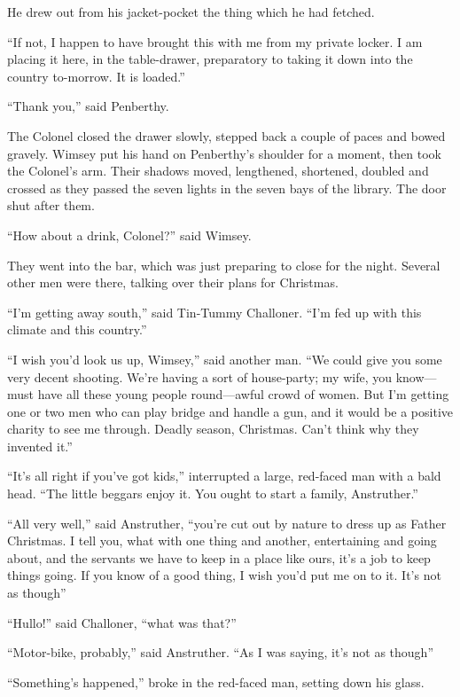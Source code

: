 He drew out from his jacket-pocket the thing which he had fetched.

\enquote{If not, I happen to have brought this with me from my private locker. I am placing it here, in the table-drawer, preparatory to taking it down into the country to-morrow. It is loaded.}

\enquote{Thank you,} said Penberthy.

The Colonel closed the drawer slowly, stepped back a couple of paces and bowed gravely. Wimsey put his hand on Penberthy's shoulder for a moment, then took the Colonel's arm. Their shadows moved, lengthened, shortened, doubled and crossed as they passed the seven lights in the seven bays of the library. The door shut after them.

\enquote{How about a drink, Colonel?} said Wimsey.

They went into the bar, which was just preparing to close for the night. Several other men were there, talking over their plans for Christmas.

\enquote{I'm getting away south,} said Tin-Tummy Challoner. \enquote{I'm fed up with this climate and this country.}

\enquote{I wish you'd look us up, Wimsey,} said another man. \enquote{We could give you some very decent shooting. We're having a sort of house-party; my wife, you know\allowbreak---\allowbreak must have all these young people round\allowbreak---\allowbreak awful crowd of women. But I'm getting one or two men who can play bridge and handle a gun, and it would be a positive charity to see me through. Deadly season, Christmas. Can't think why they invented it.}

\enquote{It's all right if you've got kids,} interrupted a large, red-faced man with a bald head. \enquote{The little beggars enjoy it. You ought to start a family, Anstruther.}

\enquote{All very well,} said Anstruther, \enquote{you're cut out by nature to dress up as Father Christmas. I tell you, what with one thing and another, entertaining and going about, and the servants we have to keep in a place like ours, it's a job to keep things going. If you know of a good thing, I wish you'd put me on to it. It's not as though\longdash}

\enquote{Hullo!} said Challoner, \enquote{what was that?}

\enquote{Motor-bike, probably,} said Anstruther. \enquote{As I was saying, it's not as though\longdash}

\enquote{Something's happened,} broke in the red-faced man, setting down his glass.

